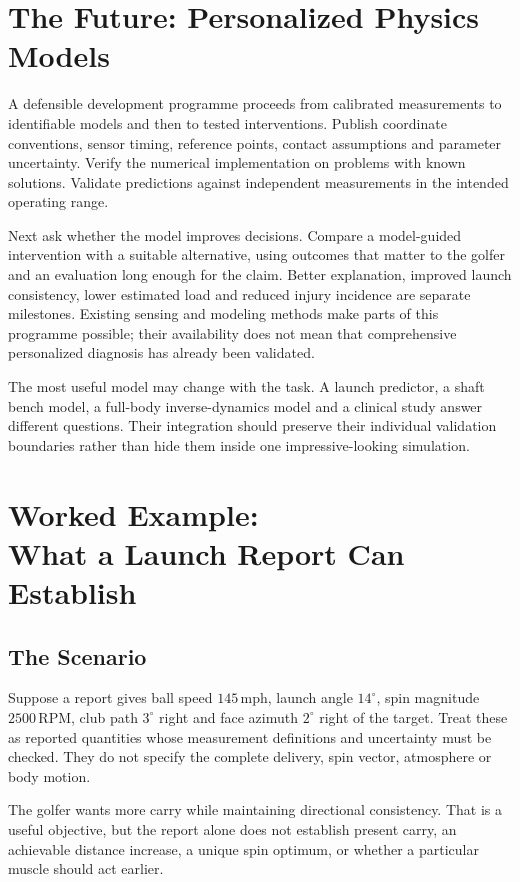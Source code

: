 \section{The Future: Personalized Physics Models}

A defensible development programme proceeds from calibrated measurements to identifiable models and then to tested interventions. Publish coordinate conventions, sensor timing, reference points, contact assumptions and parameter uncertainty. Verify the numerical implementation on problems with known solutions. Validate predictions against independent measurements in the intended operating range.

Next ask whether the model improves decisions. Compare a model-guided intervention with a suitable alternative, using outcomes that matter to the golfer and an evaluation long enough for the claim. Better explanation, improved launch consistency, lower estimated load and reduced injury incidence are separate milestones. Existing sensing and modeling methods make parts of this programme possible; their availability does not mean that comprehensive personalized diagnosis has already been validated.

The most useful model may change with the task. A launch predictor, a shaft bench model, a full-body inverse-dynamics model and a clinical study answer different questions. Their integration should preserve their individual validation boundaries rather than hide them inside one impressive-looking simulation.

\section[Worked Example: What a Launch Report Can Establish]{Worked Example:\\What a Launch Report Can Establish}

\subsection{The Scenario}

Suppose a report gives ball speed $145\,\mathrm{mph}$, launch angle $14^\circ$, spin magnitude $2500\,\mathrm{RPM}$, club path $3^\circ$ right and face azimuth $2^\circ$ right of the target. Treat these as reported quantities whose measurement definitions and uncertainty must be checked. They do not specify the complete delivery, spin vector, atmosphere or body motion.

The golfer wants more carry while maintaining directional consistency. That is a useful objective, but the report alone does not establish present carry, an achievable distance increase, a unique spin optimum, or whether a particular muscle should act earlier.

